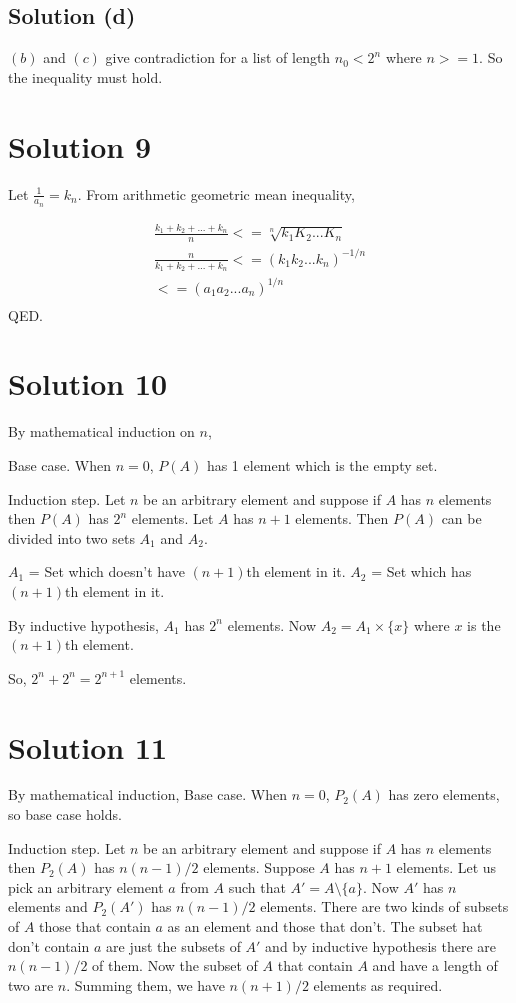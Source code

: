 \documentclass{article}
\begin{document}
\subsection{Solution (d)}
$(b)$ and $(c)$ give contradiction for a list of length $n_0 < 2^n$
where $n >= 1$. So the inequality must hold.

\section{Solution 9}
Let $\frac{1}{a_n} = k_n$. From arithmetic geometric mean inequality,

\begin{align*}
  \frac{k_1 + k_2 + ... + k_n }{n} <= \sqrt[n]{k_1K_2...K_n} \\
  \frac{n}{k_1 + k_2 + ... + k_n } <= (k_1k_2...k_n)^{-1/n} \\
  <= (a_1a_2...a_n)^{1/n} \\
\end{align*}
QED.

\section{Solution 10}
By mathematical induction on $n$,

Base case. When $n=0$, $P(A)$ has 1 element which is the empty set.

Induction step. Let $n$ be an arbitrary element and suppose if $A$ has
$n$ elements then $P(A)$ has $2^n$ elements. Let $A$ has $n+1$
elements. Then $P(A)$ can be divided into two sets $A_1$ and $A_2$.

$A_1$ = Set which doesn't have $(n+1)$th element in it.
$A_2$ = Set which has $(n+1)$th element in it.

By inductive hypothesis, $A_1$ has $2^n$ elements. Now $A_2 = A_1
\times \{x\}$ where $x$ is the $(n+1)$th element.

So, $2^n + 2^n = 2^{n+1}$ elements.

\section{Solution 11}
By mathematical induction,
Base case. When $n=0$, $P_2(A)$ has zero elements, so base case holds.

Induction step. Let $n$ be an arbitrary element and suppose if $A$ has
$n$ elements then $P_2(A)$ has $n(n-1)/2$ elements. Suppose $A$ has
$n+1$ elements. Let us pick an arbitrary element $a$ from $A$ such
that $A' = A \setminus \{a\}$. Now $A'$ has $n$ elements and $P_2(A')$
has $n(n-1)/2$ elements. There are two kinds of subsets of $A$ those
that contain $a$ as an element and those that don't. The subset hat
don't contain $a$ are just the subsets of $A'$ and by inductive
hypothesis there are $n(n-1)/2$ of them. Now the subset of $A$ that
contain $A$ and have a length of two are $n$. Summing them, we have
$n(n+1)/2$ elements as required.
\end{document}
